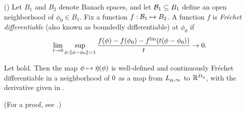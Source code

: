 \begin{defn}
    (\citep[Definition 4.5]{zeidler:2013:functional})
%
Let $B_1$ and $B_2$ denote Banach spaces, and let $\mathcal{B}_1 \subseteq B_1$ define
an open neighborhood of $\phi_0 \in B_1$.  Fix a function $f: \mathcal{B}_1
\mapsto B_2$.
%
A function $f$ is {\em Fr{\'echet} differentiable} (also known as boundedly
differentiable) at $\phi_0$ if
%
\begin{align*}
%
\lim_{t \rightarrow 0}
    \sup_{\phi: \norm{\phi - \phi_0} = 1}
    \frac{f(\phi) - f(\phi_0) -
          f^{\mathrm{lin}}(t (\phi - \phi_0))
         }{t} \rightarrow 0.
%
\end{align*}
%
\end{defn}

\begin{thm}
%
Let  hold. Then the map $\phi \mapsto
\hat\eta(\phi)$ is well-defined and continuously Fr{\'e}chet differentiable in a
neighborhood of $0$ as a map from ${L_{\mu,\infty}}$ to $\mathbb{R}^{D_{\eta}}$,
with the derivative given in .

(For a proof, see  .)

\end{thm}
